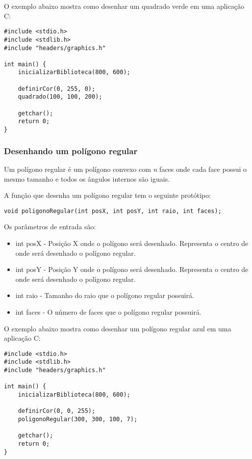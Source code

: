 \documentclass[12pt, %
openright,
oneside, %
a4paper,    %
brazil]{facom-ufu-abntex2}
\begin{document}
O exemplo abaixo mostra como desenhar um quadrado verde em uma aplicação C:

\begin{lstlisting}
#include <stdio.h>
#include <stdlib.h>
#include "headers/graphics.h"

int main() {
    inicializarBiblioteca(800, 600);

    definirCor(0, 255, 0);
    quadrado(100, 100, 200);

    getchar();
    return 0;
}
\end{lstlisting}

\subsubsection{Desenhando um polígono regular}
Um polígono regular é um polígono convexo com \textit{n} faces onde cada face possui o mesmo tamanho e todos os ângulos internos são iguais.

A função que desenha um polígono regular tem o seguinte protótipo:

\begin{lstlisting}
void poligonoRegular(int posX, int posY, int raio, int faces);
\end{lstlisting}

Os parâmetros de entrada são:

\begin{itemize}
    \item int posX - Posição X onde o polígono será desenhado. Representa o centro de onde será desenhado o polígono regular.
    \item int posY - Posição Y onde o polígono será desenhado. Representa o centro de onde será desenhado o polígono regular.
    \item int raio - Tamanho do raio que o polígono regular possuirá.
    \item int faces - O número de faces que o polígono regular possuirá.
\end{itemize}

O exemplo abaixo mostra como desenhar um polígono regular azul em uma aplicação C:

\begin{lstlisting}
#include <stdio.h>
#include <stdlib.h>
#include "headers/graphics.h"

int main() {
    inicializarBiblioteca(800, 600);

    definirCor(0, 0, 255);
    poligonoRegular(300, 300, 100, 7);

    getchar();
    return 0;
}
\end{lstlisting}
\end{document}
